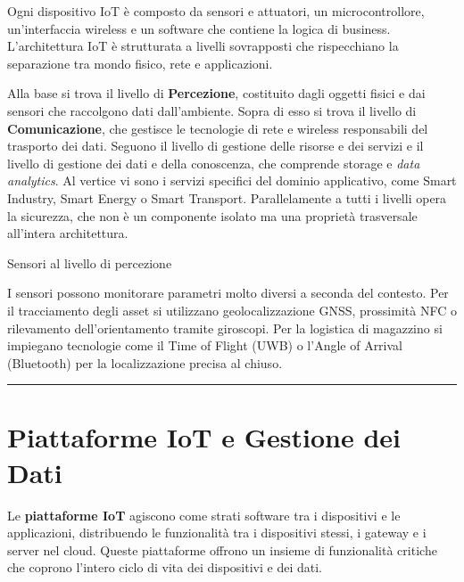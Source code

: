 \documentclass[
  italian,
  openany]{book}
\begin{document}
Ogni dispositivo IoT è composto da sensori e attuatori, un
microcontrollore, un'interfaccia wireless e un software che contiene la
logica di business. L'architettura IoT è strutturata a livelli
sovrapposti che rispecchiano la separazione tra mondo fisico, rete e
applicazioni.

Alla base si trova il livello di \textbf{Percezione}, costituito dagli
oggetti fisici e dai sensori che raccolgono dati dall'ambiente. Sopra di
esso si trova il livello di \textbf{Comunicazione}, che gestisce le
tecnologie di rete e wireless responsabili del trasporto dei dati.
Seguono il livello di gestione delle risorse e dei servizi e il livello
di gestione dei dati e della conoscenza, che comprende storage e
\emph{data analytics}. Al vertice vi sono i servizi specifici del
dominio applicativo, come Smart Industry, Smart Energy o Smart
Transport. Parallelamente a tutti i livelli opera la sicurezza, che non
è un componente isolato ma una proprietà trasversale all'intera
architettura.

\begin{calloutnote}{Sensori al livello di percezione}

I sensori possono monitorare parametri molto diversi a seconda del
contesto. Per il tracciamento degli asset si utilizzano
geolocalizzazione GNSS, prossimità NFC o rilevamento dell'orientamento
tramite giroscopi. Per la logistica di magazzino si impiegano tecnologie
come il Time of Flight (UWB) o l'Angle of Arrival (Bluetooth) per la
localizzazione precisa al chiuso.

\end{calloutnote}

\begin{center}\rule{0.5\linewidth}{0.5pt}\end{center}

\section{Piattaforme IoT e Gestione dei
Dati}\label{piattaforme-iot-e-gestione-dei-dati}

Le \textbf{piattaforme IoT} agiscono come strati software tra i
dispositivi e le applicazioni, distribuendo le funzionalità tra i
dispositivi stessi, i gateway e i server nel cloud. Queste piattaforme
offrono un insieme di funzionalità critiche che coprono l'intero ciclo
di vita dei dispositivi e dei dati.
\end{document}
